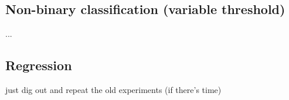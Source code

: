 \documentclass[../main.tex]{subfiles}
\begin{document}



\subsection{Non-binary classification (variable threshold)}
...

\subsection{Regression}
just dig out and repeat the old experiments (if there's time)



\end{document}
